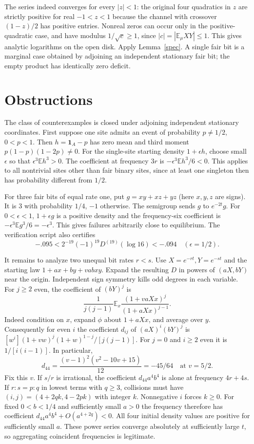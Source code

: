 \documentclass[11pt]{article}
\newcommand{\E}{\mathbb E}
\begin{document}
The series indeed converges for every $|z|<1$: the original four
quadratics in $z$ are strictly positive for real $-1<z<1$ because the
channel with crossover $(1-z)/2$ has positive entries.
Nonreal zeros can occur only in the positive-quadratic case, and have
modulus $1/\sqrt c\ge1$, since $|c|=|\E_\mu XY|\le1$.
This gives analytic logarithms on the open disk. Apply Lemma~\ref{spec}.
A single fair bit is a marginal case obtained by adjoining an independent
stationary fair bit; the empty product has identically zero deficit.

\section{Obstructions}
The class of counterexamples is closed under adjoining independent
stationary coordinates. First suppose one site admits an event of
probability $p\ne1/2$, $0<p<1$. Then $h=\mathbf1_A-p$ has zero mean
and third moment $p(1-p)(1-2p)\ne0$. For the single-site starting density
$1+\epsilon h$, choose small $\epsilon$ so that $\epsilon^3\E h^3>0$.
The coefficient at frequency $3r$ is
$-\epsilon^3\E h^3/6<0$. This applies to all nontrivial sites other than
fair binary sites, since at least one singleton then has probability
different from $1/2$.

For three fair bits of equal rate one, put
$g=xy+xz+yz$ (here $x,y,z$ are signs). It is $3$ with probability
$1/4$, $-1$ otherwise. The semigroup sends $g$ to $e^{-2t}g$.
For $0<\epsilon<1$, $1+\epsilon g$ is a positive density and
the frequency-six coefficient is $-\epsilon^3\E g^3/6=-\epsilon^3$.
This gives failures arbitrarily close to equilibrium. The verification
script also certifies
\[
 -.095<2^{-19}(-1)^{19}D^{(19)}(\log 16)<-.094
 \quad(\epsilon=1/2).
\]

It remains to analyze two unequal bit rates $r<s$. Use
$X=e^{-rt},Y=e^{-st}$ and the starting law $1+ax+by+vabxy$.
Expand the resulting $D$ in powers of $(aX,bY)$ near the origin.
Independent sign symmetry kills odd degrees in each variable.
For $j\ge2$ even, the coefficient of $(bY)^j$ is
\[
 \frac1{j(j-1)}\E_x\frac{(1+vaXx)^j}{(1+aXx)^{j-1}}.
\]
Indeed condition on $x$, expand $\phi$ about $1+aXx$, and average over $y$.
Consequently for even $i$ the coefficient $d_{ij}$ of $(aX)^i(bY)^j$
is $[w^i](1+vw)^j(1+w)^{1-j}/[j(j-1)]$.
For $j=0$ and $i\ge2$ even it is $1/[i(i-1)]$.
In particular,
\[
 d_{44}=\frac{(v-1)^2(v^2-10v+15)}{12}=-45/64
 \quad\text{at }v=5/2.
\]
Fix this $v$. If $s/r$ is irrational, the coefficient
$d_{44}a^4b^4$ is alone at frequency $4r+4s$.
If $r:s=p:q$ in lowest terms with $q\ge3$, collisions must have
$(i,j)=(4+2qk,4-2pk)$ with integer $k$. Nonnegative $i$ forces $k\ge0$.
For fixed $0<b<1/4$ and sufficiently small $a>0$ the frequency therefore
has coefficient $d_{44}a^4b^4+O(a^{4+2q})<0$.
All four initial density values are positive for sufficiently small $a$.
These power series converge absolutely at sufficiently large $t$,
so aggregating coincident frequencies is legitimate.
\end{document}
